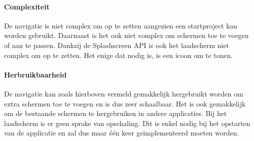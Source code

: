 \paragraph{Complexiteit}
De navigatie is niet complex om op te zetten aangezien een startproject kan worden gebruikt.
Daarnaast is het ook niet complex om schermen toe te voegen of aan te passen.
Dankzij de Splashscreen API is ook het laadscherm niet complex om op te zetten. 
Het enige dat nodig is, is een icoon om te tonen.

\paragraph{Herbruikbaarheid}
De navigatie kan zoals hierboven vermeld gemakkelijk hergebruikt worden om extra schermen 
toe te voegen en is dus zeer schaalbaar.
Het is ook gemakkelijk om de bestaande schermen te hergebruiken in andere applicaties. 
Bij het laadscherm is er geen sprake van opschaling. Dit is enkel nodig bij het opstarten 
van de applicatie en zal dus maar één keer geïmplementeerd moeten worden.
